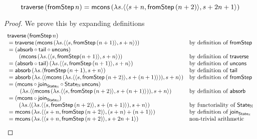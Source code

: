 \begin{lemma}\label{lemma:traverse_fromstepstr}
$$
\mathsf{traverse}\, (\mathsf{fromStep}\, n) = \mathsf{mcons}\, (\lambda s . \langle \langle s+n, \mathsf{fromStep}\, (n + 2) \rangle, s + 2n + 1 \rangle)
$$
\end{lemma} 

\begin{proof}
We prove this by expanding definitions
$$
\begin{array}{ll}
\mathsf{traverse}\, (\mathsf{fromStep}\, n) \\
{}= \mathsf{traverse}\, (\mathsf{mcons}\, (\lambda s. \langle \langle s, \mathsf{fromStep}\, (n + 1) \rangle, s + n \rangle))
	& \mbox{by definition of }\mathsf{fromStep} \\
{}= (\mathsf{absorb} \circ \mathsf{tail} \circ \mathsf{uncons})\, \\\qquad (\mathsf{mcons}\, (\lambda s. \langle \langle s, \mathsf{fromStep} (n + 1) \rangle, s + n \rangle))
	& \mbox{by definition of }\mathsf{traverse} \\
{}= (\mathsf{absorb} \circ \mathsf{tail})\, (\lambda s. \langle \langle s, \mathsf{fromStep}\, (n + 1) \rangle, s + n \rangle)
	& \mbox{by definition of }\mathsf{uncons} \\
{}= \mathsf{absorb}\, (\lambda s. \langle \mathsf{fromStep}\, (n + 1), s + n \rangle)
	& \mbox{by definition of }\mathsf{tail} \\
{}= \mathsf{absorb}\, (\lambda s. \langle (\mathsf{mcons}\, (\lambda s. \langle \langle s, \mathsf{fromStep}\, (n + 2) \rangle, s + (n + 1) \rangle)), s + n \rangle)
	& \mbox{by definition of }\mathsf{fromStep} \\
{}= (\mathsf{mcons} \circ \mathsf{join}_{\mathsf{State}_{\mathbb{N}}} \circ \mathsf{State}_{\mathbb{N}}\,\mathsf{uncons}) \\\qquad \, (\lambda s. \langle (\mathsf{mcons}\, (\lambda s. \langle \langle s, \mathsf{fromStep}\, (n + 2) \rangle, s + (n + 1) \rangle)), s + n \rangle)
	& \mbox{by definition of }\mathsf{absorb} \\
{}= (\mathsf{mcons} \circ \mathsf{join}_{\mathsf{State}_{\mathbb{N}}})\, \\\qquad (\lambda s. \langle (\lambda s. \langle \langle s, \mathsf{fromStep}\, (n + 2) \rangle, s + (n + 1) \rangle), s + n \rangle)
	& \mbox{by functoriality of }\mathsf{State}_{\mathbb{N}} \\
{}= \mathsf{mcons}\, (\lambda s. \langle \langle s + n, \mathsf{fromStep}\,(n + 2) \rangle, (s + n) + (n + 1) \rangle)
	& \mbox{by definition of } \mathsf{join}_{\mathsf{State}_{\mathbb{N}}} \\
{}= \mathsf{mcons}\, (\lambda s. \langle \langle s + n, \mathsf{fromStep}\,(n + 2) \rangle, s + 2n + 1 \rangle)
	& \mbox{non-trivial arithmetic} \\
\end{array}
$$
\end{proof}

